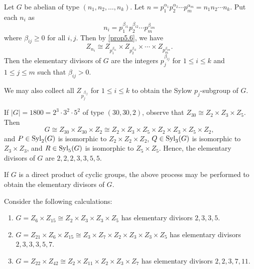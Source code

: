 \note Let $G$ be abelian of type $(n_1, n_2, \ldots, n_k)$. Let $n = p_1^{\alpha_1} p_2^{\alpha_2} \cdots p_m^{\alpha_m} = n_1n_2 \cdots n_k$. Put each $n_i$ as
\[n_i = p_1^{\beta_{i1}} p_2^{\beta_{i2}} \cdots p_m^{\beta_{im}}\]
where $\beta_{ij} \geq 0$ for all $i, j$. Then by \autoref{prop5.6}, we have
\[Z_{n_i} \cong Z_{p_1^{\beta_{i1}}} \times Z_{p_2^{\beta_{i2}}} \times \cdots \times Z_{p_m^{\beta_{im}}}.\]
Then the elementary divisors of $G$ are the integers $p_j^{\beta_{ij}}$ for $1 \leq i \leq k$ and $1 \leq j \leq m$ such that $\beta_{ij} > 0$.

We may also collect all $Z_{p_j^{\beta_{ij}}}$ for $1 \leq i \leq k$ to obtain the Sylow $p_j$-subgroup of $G$.

\ex If $|G| = 1800 = 2^3 \cdot 3^2 \cdot 5^2$ of type $(30, 30, 2)$, observe that $Z_{30} \cong Z_2 \times Z_3 \times Z_5$. Then
\[G \cong Z_{30} \times Z_{30} \times Z_2 \cong Z_2 \times Z_3 \times Z_5 \times Z_2 \times Z_3 \times Z_5 \times Z_2,\]
and $P \in \operatorname{Syl}_2(G)$ is isomorphic to $Z_2 \times Z_2 \times Z_2$, $Q \in \operatorname{Syl}_3(G)$ is isomorphic to $Z_3 \times Z_3$, and $R \in \operatorname{Syl}_5(G)$ is isomorphic to $Z_5 \times Z_5$. Hence, the elementary divisors of $G$ are $2, 2, 2, 3, 3, 5, 5$.

\note If $G$ is a direct product of cyclic groups, the above process may be performed to obtain the elementary divisors of $G$.

\ex Consider the following calculations:
\begin{enumerate}
    \item $G = Z_6 \times Z_{15} \cong Z_2 \times Z_3 \times Z_3 \times Z_5$ has elementary divisors $2, 3, 3, 5$.
    \item $G = Z_{21} \times Z_6 \times Z_{15} \cong Z_3 \times Z_7 \times Z_2 \times Z_3 \times Z_3 \times Z_5$ has elementary divisors $2, 3, 3, 3, 5, 7$.
    \item $G = Z_{22} \times Z_{42} \cong Z_2 \times Z_{11} \times Z_2 \times Z_3 \times Z_7$ has elementary divisors $2, 2, 3, 7, 11$.
\end{enumerate}

\newpage

